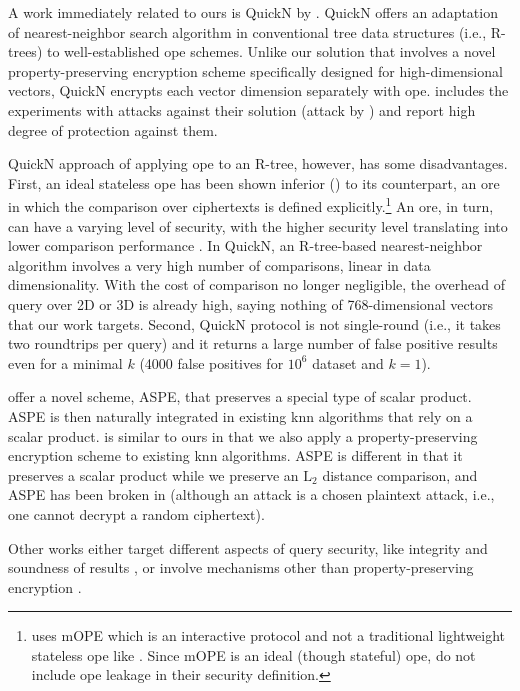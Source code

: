 		A work immediately related to ours is QuickN by \textcite{quick-n}.
		QuickN offers an adaptation of nearest-neighbor search algorithm in conventional tree data structures (i.e., R-trees) to well-established \acrfull{ope} schemes.
		Unlike our solution that involves a novel property-preserving encryption scheme specifically designed for high-dimensional vectors, QuickN encrypts each vector dimension separately with \acrshort{ope}.
		\cite{quick-n} includes the experiments with attacks against their solution (attack by \textcite{leakage-abuse-grubs-2017}) and report high degree of protection against them.

		QuickN approach of applying \acrshort{ope} to an R-tree, however, has some disadvantages.
		First, an ideal stateless \acrshort{ope} has been shown inferior (\cite{ope-leakage}) to its counterpart, an \acrfull{ore} in which the comparison over ciphertexts is defined explicitly.\footnote{
			\cite{quick-n} uses mOPE \cite{ope-ideal-security-protocol} which is an interactive protocol and not a traditional lightweight stateless \acrshort{ope} like \cite{bclo-ope}.
			Since mOPE is an ideal (though stateful) \acrshort{ope}, \cite{quick-n} do not include \acrshort{ope} leakage in their security definition.
		}
		An \acrshort{ore}, in turn, can have a varying level of security, with the higher security level translating into lower comparison performance \cite{ore-benchmark-17}.
		In QuickN, an R-tree-based nearest-neighbor algorithm involves a very high number of comparisons, linear in data dimensionality.
		With the cost of comparison no longer negligible, the overhead of query over 2D or 3D is already high, saying nothing of 768-dimensional vectors that our work targets.
		Second, QuickN protocol is not single-round (i.e., it takes two roundtrips per query) and it returns a large number of false positive results even for a minimal $k$ (\num{4000} false positives for $10^6$ dataset and $k = 1$).

		\textcite{knn-aspe} offer a novel scheme, ASPE, that preserves a special type of scalar product.
		ASPE is then naturally integrated in existing \acrshort{knn} algorithms that rely on a scalar product.
		\cite{knn-aspe} is similar to ours in that we also apply a property-preserving encryption scheme to existing \acrshort{knn} algorithms.
		ASPE is different in that it preserves a scalar product while we preserve an $\text{L}_2$ distance comparison, and ASPE has been broken in \cite{secure-nn-revisited-break-aspe} (although an attack is a chosen plaintext attack, i.e., one cannot decrypt a random ciphertext).

		Other works either target different aspects of query security, like integrity and soundness of results \cite{knn-integrity-soundness,svknn}, or involve mechanisms other than property-preserving encryption \cite{seceqp,practical-approx-knn,knn-sharing-keys,knn-mult-data-owners,knn-over-encrypted,knn-paillier,knn-blind,knn-homomorphism,knn-strong-location-privacy,knn-no-anonymizers,knn-efficient,knn-new-casper}.
